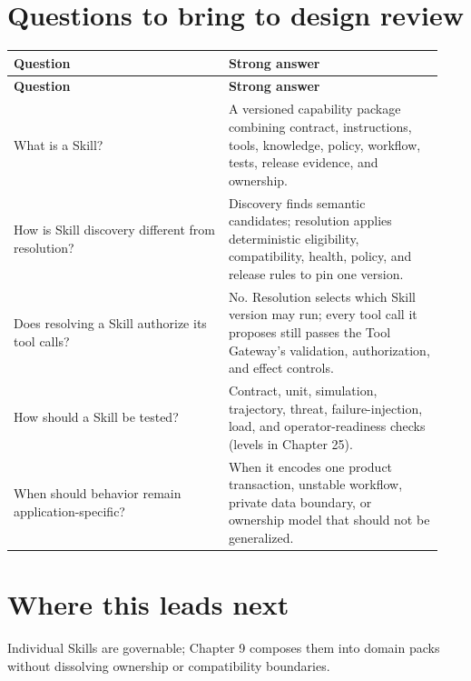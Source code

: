 \section{Questions to bring to design review}

\BookTableStart
\small
\begin{longtable}{@{}Y{0.4700\linewidth}Y{0.4700\linewidth}@{}}
\color{white}\bfseries \textbf{Question} & \color{white}\bfseries \textbf{Strong answer} \\
\endfirsthead
{}
\color{white}\bfseries \textbf{Question} & \color{white}\bfseries \textbf{Strong answer} \\
\endhead
What is a Skill? & A versioned capability package combining contract, instructions, tools, knowledge, policy, workflow, tests, release evidence, and ownership. \\
How is Skill discovery different from resolution? & Discovery finds semantic candidates; resolution applies deterministic eligibility, compatibility, health, policy, and release rules to pin one version. \\
Does resolving a Skill authorize its tool calls? & No. Resolution selects which Skill version may run; every tool call it proposes still passes the Tool Gateway's validation, authorization, and effect controls. \\
How should a Skill be tested? & Contract, unit, simulation, trajectory, threat, failure-injection, load, and operator-readiness checks (levels in Chapter 25). \\
When should behavior remain application-specific? & When it encodes one product transaction, unstable workflow, private data boundary, or ownership model that should not be generalized. \\
\end{longtable}
\BookTableEnd

\section{Where this leads next}

Individual Skills are governable; Chapter 9 composes them into domain packs without dissolving ownership or compatibility boundaries.\par


